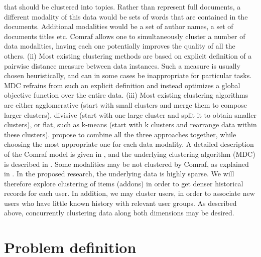 \documentclass[11pt,oneside]{book}
\begin{document}
that should be clustered into topics. Rather than represent full
documents, a different modality of this data would be sets of words
that are contained in the documents. Additional modalities would be a
set of author names, a set of documents titles etc. Comraf allows one
to simultaneously cluster a number of data modalities, having each one
potentially improves the quality of all the others. (ii) Most existing
clustering methods are based on explicit definition of a pairwise
distance measure between data instances. Such a measure is usually
chosen heuristically, and can in some cases be inappropriate for
particular tasks. MDC refrains from such an explicit definition and
instead optimizes a global objective function over the entire
data. (iii) Most existing clustering algorithms are either
agglomerative (start with small clusters and merge them to compose
larger clusters), divisive (start with one large cluster and split it
to obtain smaller clusters), or flat, such as k-means (start with k
clusters and rearrange data within these clusters). \citep{bekkerman05} propose to combine all the three approaches together, while
choosing the most appropriate one for each data modality. A detailed
description of the Comraf model is given in \citep{bekkerman2006semi}, and
the underlying clustering algorithm (MDC) is described in \citep{bekkerman05}. Some modalities may be not clustered by Comraf, as explained
in \citep{bekkerman2007multi}.  In the proposed research, the underlying
data is highly sparse. We will therefore explore clustering of items
(addons) in order to get denser historical records for each user. In
addition, we may cluster users, in order to associate new users who
have little known history with relevant user groups. As described
above, concurrently clustering data along both dimensions may be
desired.

\chapter{Problem definition}
\end{document}
